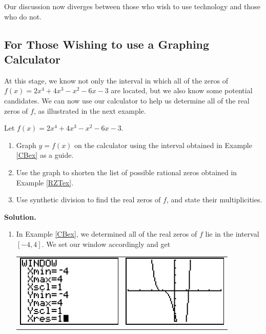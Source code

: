 Our discussion now diverges between those who wish to use technology and those who do not.  

\subsection{For Those Wishing to use a Graphing Calculator}

At this stage, we know not only the interval in which all of the zeros of $f(x) = 2x^4+4x^3-x^2-6x-3$ are located, but we also know some potential candidates.  We can now use our calculator to help us determine all of the real zeros of $f$, as illustrated in the next example.

\begin{ex}  Let $f(x) = 2x^4+4x^3-x^2-6x-3$.  

\begin{enumerate}

\item  Graph $y=f(x)$ on the calculator using the interval obtained in Example \ref{CBex} as a guide.

\item  Use the graph to shorten the list of possible rational zeros obtained in Example \ref{RZTex}.

\item  Use synthetic division to find the real zeros of $f$, and state their multiplicities.


\end{enumerate}

{\bf Solution.}

\begin{enumerate}

\item  In Example \ref{CBex}, we determined all of the real zeros of $f$ lie in the interval $[-4, 4]$.  We set our window accordingly and get

\begin{center}

\begin{tabular}{cc}

\includegraphics[width=2in]{./PolynomialsGraphics/RealZero01.jpg} \hspace{0.75in} & \includegraphics[width=2in]{./PolynomialsGraphics/RealZero02.jpg}


\end{tabular}
\end{center}
\end{enumerate}
\end{ex}
